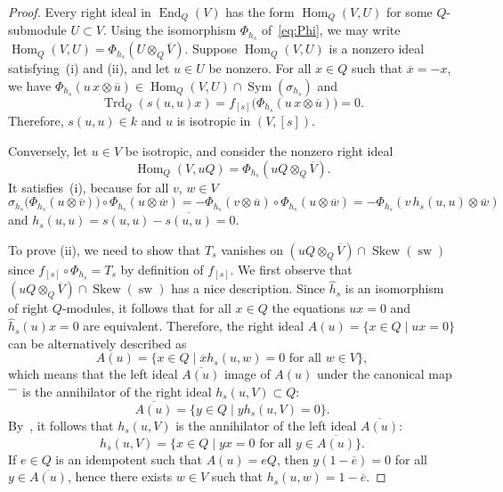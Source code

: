 \documentclass{amsart}
\newcommand{\invo}{\overline{\rule{2.5mm}{0mm}\rule{0mm}{4pt}}}
\DeclareMathOperator{\sw}{sw}
\DeclareMathOperator{\End}{End}
\DeclareMathOperator{\Hom}{Hom}
\DeclareMathOperator{\Trd}{Trd}
\DeclareMathOperator{\Sym}{Sym}
\DeclareMathOperator{\Skew}{Skew}
\theoremstyle{remark}
\begin{document}
\begin{proof}
  Every right ideal in $\End_Q(V)$ has the form $\Hom_Q(V,U)$ for some
  $Q$-submodule $U\subset V$. Using the isomorphism $\Phi_{h_s}$
  of~\eqref{eq:Phi}, we may write $\Hom_Q(V,U) = \Phi_{h_s}(U\otimes_Q
  \overline V)$. Suppose $\Hom_Q(V,U)$ is a nonzero ideal
  satisfying~(i) and (ii), and let $u\in U$ be nonzero. For all $x\in
  Q$ such that $\overline x=-x$, we have $\Phi_{h_s}(u\,x\otimes
  \overline u) \in \Hom_Q(V,U)\cap \Sym(\sigma_{h_s})$ and
  \begin{equation}
    \label{eq:Trsu}
    \Trd_Q(s(u,u)x) = f_{[s]}\bigl(\Phi_{h_s}(u\,x\otimes \overline
    u)\bigr) = 0.
  \end{equation}
  Therefore, $s(u,u)\in k$ and $u$ is isotropic in $(V,[s])$.

  Conversely, let $u\in V$ be isotropic, and consider the nonzero
  right ideal \[
    \Hom_Q(V,uQ)=\Phi_{h_s}(uQ\otimes_Q\overline V).
  \] 
  It satisfies~(i), because
  for all $v$, $w\in V$
  \[
    \sigma_{h_s}\bigl(\Phi_{h_s}(u\otimes \overline v)\bigr)\circ
    \Phi_{h_s}(u\otimes \overline w) = -\Phi_{h_s}(v\otimes \overline
    u) \circ 
    \Phi_{h_s}(u\otimes\overline w) = - \Phi_{h_s}(v\,h_s(u,u) \otimes
    \overline w)
  \]
  and $h_s(u,u) = s(u,u)-\overline{s(u,u)} = 0$.

  To prove (ii), we need to show that $T_s$ vanishes on
  $(uQ\otimes_Q\overline V)\cap \Skew(\sw)$ since $f_{[s]}\circ
  \Phi_{h_s} = T_s$ by definition of $f_{[s]}$.
  We first observe that  $(uQ\otimes_Q\overline V)\cap\Skew(\sw)$ has
  a nice description.   
  Since $\widehat h_s$ is an isomorphism of right $Q$-modules, it
follows that for all $x\in Q$ the equations $ux=0$ and
$\widehat h_s(u)x=0$ are equivalent. Therefore, the right ideal
$A(u)=\{x\in Q\mid ux=0\}$ can be alternatively described as
\[
  A(u)=\{x\in Q\mid \overline x h_s(u,w)=0 \text{ for all $w\in V$}\},
\]
which means that the left ideal $\overline{A(u)}$ image of $A(u)$
under the canonical map $\invo$ is the annihilator of the right ideal
$h_s(u,V)\subset Q$:
\[
  \overline{A(u)} = \{y\in Q\mid yh_s(u,V)=0\}.
\]
By~\cite[(1.14)]{BoI}, it follows that $h_s(u,V)$ is the annihilator
of the left ideal $\overline{A(u)}$:
\[
  h_s(u,V) = \{x\in Q\mid yx=0 \text{ for all $y\in
    \overline{A(u)}$}\}.
\]
If $e\in Q$ is an idempotent such that $A(u)=eQ$, then $y(1-\overline
e)=0$ for all $y\in\overline{A(u)}$, hence there exists $w\in V$ such
that $h_s(u,w)=1-\overline e$.


\end{proof}
\end{document}
